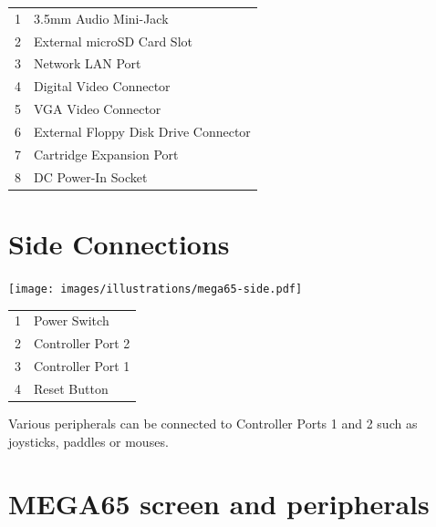 \begin{center}
\begin{longtable}{ c | l}
	1	& 	3.5mm Audio Mini-Jack \\
	2	& 	External microSD Card Slot\\
	3	& 	Network LAN Port \\
	4	& 	Digital Video Connector \\
	5	& 	VGA Video Connector \\
	6	& 	External Floppy Disk Drive Connector \\
	7	& 	Cartridge Expansion Port \\
	8	& 	DC Power-In Socket \\
\end{longtable}
\end{center}

\vspace{-1cm}

\section{Side Connections}

\texttt{[image: images/illustrations/mega65-side.pdf]}

\begin{center}
\begin{longtable}{ c | l}
	1	& 	Power Switch \\
	2	& 	Controller Port 2 \\
	3	& 	Controller Port 1 \\
	4	& 	Reset Button \\
\end{longtable}
\end{center}
Various peripherals can be connected to Controller Ports 1 and 2 such as
joysticks, paddles or mouses.

\newpage

\section{MEGA65 screen and peripherals}

